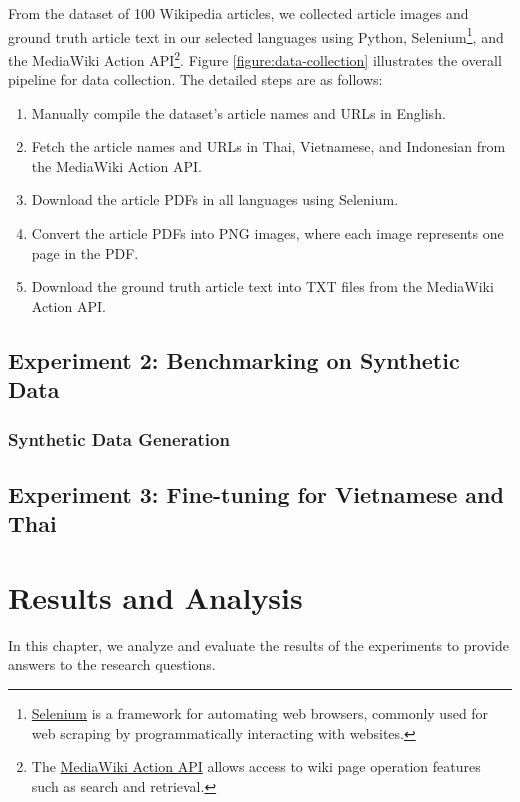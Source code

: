 \documentclass[12pt,oneside]{memoir}
\begin{document}
From the dataset of 100 Wikipedia articles, we collected article images and ground 
truth article text in our selected languages using Python, 
Selenium\footnote{\href{https://selenium-python.readthedocs.io}{Selenium} is a 
framework for automating web browsers, commonly used for web scraping by programmatically 
interacting with websites.}, and the MediaWiki Action API\footnote{The \href{https://www.mediawiki.org/wiki/API:Main_page}{MediaWiki Action API} allows 
access to wiki page operation features such as search and retrieval.}. Figure \ref{figure:data-collection} illustrates the overall pipeline 
for data collection. The detailed steps are as follows:

\begin{enumerate}
    \item Manually compile the dataset’s article names and URLs in English.
    \item Fetch the article names and URLs in Thai, Vietnamese, and Indonesian from the MediaWiki Action API.
    \item Download the article PDFs in all languages using Selenium.
    \item Convert the article PDFs into PNG images, where each image represents one page in the PDF.
    \item Download the ground truth article text into TXT files from the MediaWiki Action API.
\end{enumerate}

\section{Experiment 2: Benchmarking on Synthetic Data}

\subsection{Synthetic Data Generation}

\section{Experiment 3: Fine-tuning for Vietnamese and Thai}

\chapter{Results and Analysis}

In this chapter, we analyze and evaluate the results of the experiments to provide answers to the research questions.
\end{document}
